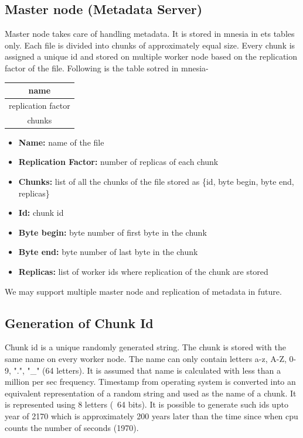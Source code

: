 \documentclass[a4paper,12pt]{article}
\begin{document}
\subsection{Master node (Metadata Server)}
Master node takes care of handling metadata. It is stored in mnesia in ets tables only. Each file is divided into chunks of approximately equal size. Every chunk is assigned a unique id and stored on multiple worker node based on the replication factor of the file. Following is the table sotred in mnesia-
\begin{table}[h]
\centering
\begin{tabular}{|c|}
\hline 
name \\ 
\hline 
replication factor \\ 
\hline 
chunks \\ 
\hline 
\end{tabular} 
\end{table}

\begin{itemize}
\item \textbf{Name:} name of the file
\item \textbf{Replication Factor:} number of replicas of each chunk
\item \textbf{Chunks:} list of all the chunks of the file stored as \{id, byte begin, byte end, replicas\}
\item \textbf{Id:} chunk id
\item \textbf{Byte begin:} byte number of first byte in the chunk
\item \textbf{Byte end:} byte number of last byte in the chunk
\item \textbf{Replicas:} list of worker ids where replication of the chunk are stored
\end{itemize}

We may support multiple master node and replication of metadata in future.

\subsection{Generation of Chunk Id}
Chunk id is a unique randomly generated string. The chunk is stored with the same name on every worker node. The name can only contain letters a-z, A-Z, 0-9, ".", "\_" (64 letters). It is assumed that name is calculated with less than a million per sec frequency.  Timestamp from operating system is converted into an equivalent representation of a random string and used as the name of a chunk. It is represented using 8 letters (~64 bits). It is possible to generate such ids upto year of 2170 which is approximately 200 years later than the time since when cpu counts the number of seconds (1970).
\end{document}
